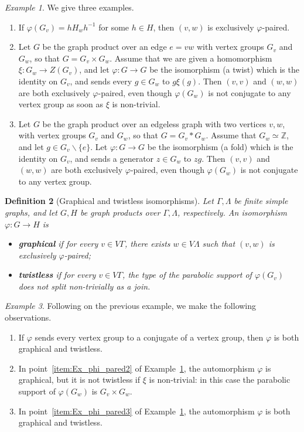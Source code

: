 \documentclass[a4paper,english,11pt]{article}
\newtheorem{de}{Definition}[section]
\theoremstyle{definition}
\theoremstyle{remark}
\newtheorem{ex}[de]{Example}
\newcommand{\twistor}{\xi}
\newcommand{\deffont}[1]{\textbf{#1}}
\begin{document}
\begin{ex}\label{Rk:vertex-exclusively-phi-paired}
We give three examples.
\begin{enumerate}
\item If $\varphi(G_v)=hH_wh^{-1}$ for some $h\in H$, then $(v,w)$ is exclusively $\varphi$-paired. 
\item \label{item:Ex_phi_pared2}Let $G$ be the graph product over an edge $e=vw$ with vertex groups $G_v$ and $G_w$, so that $G=G_v\times G_w$. Assume that we are given a homomorphism $\twistor:G_w\to Z(G_v)$, and let $\varphi:G\to G$ be the isomorphism (a twist) which is the identity on $G_v$, and sends every $g\in G_w$ to $g\twistor(g)$. Then $(v,v)$ and $(w,w)$ are both exclusively $\varphi$-paired, even though $\varphi(G_w)$ is not conjugate to any vertex group as soon as $\twistor$ is non-trivial.
\item \label{item:Ex_phi_pared3}Let $G$ be the graph product over an edgeless graph with two vertices $v,w$, with vertex groups $G_v$ and $G_w$, so that $G=G_v*G_w$. Assume that  $G_w\simeq\mathbb{Z}$, and let $g\in G_v\backslash \{e\}$.
Let $\varphi:G\to G$ be the isomorphism (a fold) which is the identity on $G_v$, and sends a generator $z\in G_w$ to $zg$. Then $(v,v)$ and $(w,w)$ are both exclusively $\varphi$-paired, even though $\varphi(G_w)$ is not conjugate to any vertex group.
\end{enumerate}
\end{ex}

\begin{de}[Graphical and twistless isomorphisms]\label{de:clean}
Let $\Gamma,\Lambda$ be finite simple graphs, and let $G,H$ be graph products over $\Gamma,\Lambda$, respectively. An isomorphism $\varphi:G\to H$ is  
\begin{itemize}
\item \deffont{graphical} if for every $v\in V\Gamma$, there exists $w\in V\Lambda$ such that $(v,w)$ is exclusively $\varphi$-paired;
\item \deffont{twistless} if for every $v\in V\Gamma$, the type of the parabolic support of $\varphi(G_v)$ does not split non-trivially as a join.
\end{itemize}
\end{de}

\begin{ex} Following on the previous example, we make the following observations.
\begin{enumerate}
\item If $\varphi$ sends every vertex group to a conjugate of a vertex group, then $\varphi$ is both graphical and twistless.
\item In point~\ref{item:Ex_phi_pared2} of Example~\ref{Rk:vertex-exclusively-phi-paired}, the automorphism $\varphi$ is graphical, but it is not twistless if $\twistor$ is non-trivial: in this case the parabolic support of $\varphi(G_w)$ is $G_v\times G_w$.
\item In point~\ref{item:Ex_phi_pared3} of Example~\ref{Rk:vertex-exclusively-phi-paired}, the automorphism $\varphi$ is both graphical and twistless. 
\end{enumerate}
\end{ex}
\end{document}
